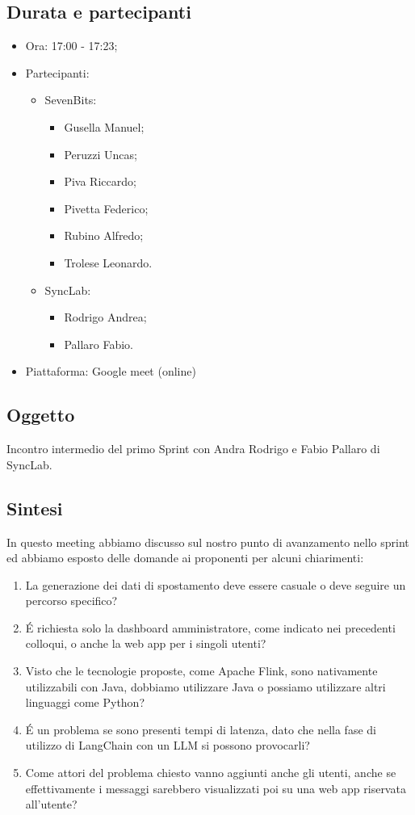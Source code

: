 \documentclass[12pt]{article}
\begin{document}
\subsection{Durata e partecipanti}
\begin{itemize}
\item Ora: 17:00 - 17:23;
\item Partecipanti: 	
	\begin{itemize}
        \item SevenBits:
        \begin{itemize}
			\item Gusella Manuel;
			\item Peruzzi Uncas;
			\item Piva Riccardo;
			\item Pivetta Federico;
			\item Rubino Alfredo;
			\item Trolese Leonardo.
		\end{itemize}
		\item SyncLab:
		\begin{itemize}
			\item Rodrigo Andrea;
			\item Pallaro Fabio.
		\end{itemize}
	\end{itemize}
\item Piattaforma: Google meet (online)
\end{itemize}
\subsection{Oggetto}
Incontro intermedio del primo Sprint con Andra Rodrigo e Fabio Pallaro di SyncLab.

\subsection{Sintesi}
In questo meeting abbiamo discusso sul nostro punto di avanzamento nello sprint ed abbiamo esposto delle domande ai proponenti per alcuni chiarimenti:\\
\begin{enumerate}
\item \label{uno} La generazione dei dati di spostamento deve essere casuale o deve seguire un percorso specifico?
\item \label{due} \'E richiesta solo la dashboard amministratore, come indicato nei precedenti colloqui, o anche la web app per i singoli utenti?
\item \label{tre} Visto che le tecnologie proposte, come Apache Flink, sono nativamente utilizzabili con Java, dobbiamo utilizzare Java o possiamo utilizzare altri linguaggi come Python?
\item \label{quattro} \'E un problema se sono presenti tempi di latenza, dato che nella fase di utilizzo di LangChain con un LLM si possono provocarli?
\item \label{cinque} Come attori del problema chiesto vanno aggiunti anche gli utenti, anche se effettivamente i messaggi sarebbero visualizzati poi su una web app riservata all'utente?
\end{enumerate}
\end{document}
